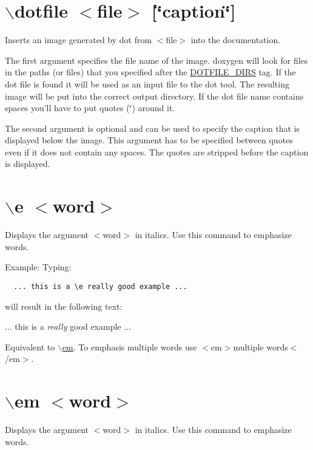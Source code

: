 \hypertarget{commands_cmddotfile}{}\section{$\backslash$dotfile $<$file$>$ \mbox{[}\char`\"{}caption\char`\"{}\mbox{]}}\label{commands_cmddotfile}
 Inserts an image generated by dot from $<$file$>$ into the documentation.

The first argument specifies the file name of the image. doxygen will look for files in the paths (or files) that you specified after the \hyperlink{config_cfg_dotfile_dirs}{DOTFILE\_\-DIRS} tag. If the dot file is found it will be used as an input file to the dot tool. The resulting image will be put into the correct output directory. If the dot file name contains spaces you'll have to put quotes (\char`\"{}) around it.

The second argument is optional and can be used to specify the caption that is displayed below the image. This argument has to be specified between quotes even if it does not contain any spaces. The quotes are stripped before the caption is displayed.



 \hypertarget{commands_cmde}{}\section{$\backslash$e $<$word$>$}\label{commands_cmde}
 Displays the argument $<$word$>$ in italics. Use this command to emphasize words.

\begin{Desc}
\item[Example:]Typing: 

\footnotesize\begin{verbatim}
  ... this is a \e really good example ... 
  \end{verbatim}
\normalsize
 will result in the following text:\par
\par
 ... this is a {\em really\/} good example ...\end{Desc}
Equivalent to \hyperlink{commands_cmdem}{$\backslash$em}. To emphasis multiple words use $<$em$>$multiple words$<$/em$>$.



 \hypertarget{commands_cmdem}{}\section{$\backslash$em $<$word$>$}\label{commands_cmdem}
 Displays the argument $<$word$>$ in italics. Use this command to emphasize words.

